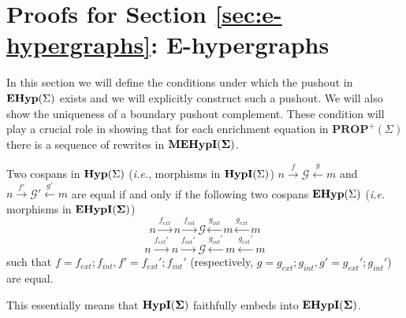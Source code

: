 \section{Proofs for Section \ref{sec:e-hypergraphs}: E-hypergraphs}
\label{sec:appendix:2}

In this section we will define the conditions under which the pushout in $\mathbf{EHyp}(\Sigma)$ exists and we will explicitly construct such a pushout.
We will also show the uniqueness of a boundary pushout complement.
These condition will play a crucial role in showing that for each enrichment equation in $\textbf{PROP}^{+}(\Sigma)$ there is a sequence of rewrites in ${\mathbf{MEHypI(\Sigma)}}$.

\begin{proposition}
    Two cospans in $\mathbf{Hyp}(\Sigma)$ (\textit{i.e.}, morphisms in $\textbf{HypI}(\Sigma)$) $n \xrightarrow{f} \mathcal{G} \xleftarrow{g} m$ and $n \xrightarrow{f'} \mathcal{G}' \xleftarrow{g'} m$ are equal if and only if
    the following two cospans  $\mathbf{EHyp}(\Sigma)$ (\textit{i.e.} morphisms in ${\mathbf{EHypI(\Sigma)}}$)
    \[
    n \xrightarrow{f_{ext}} n \xrightarrow{f_{int}} \mathcal{G} \xleftarrow{g_{int}} m \xleftarrow{g_{ext}} m
    \]
    \[
        n \xrightarrow{f_{ext}'} n \xrightarrow{f_{int}'} \mathcal{G} \xleftarrow{g_{int}'} m \xleftarrow{g_{ext}'} m    
    \]
    such that $f = f_{ext};f_{int}, f'=f_{ext}';f_{int}'$ (respectively, $g = g_{ext};g_{int}, g' = g_{ext}';g_{int}'$) are equal.
\end{proposition}
This essentially means that $\mathbf{\textbf{HypI}(\Sigma)}$ faithfully embeds into ${\mathbf{EHypI(\Sigma)}}$. 
